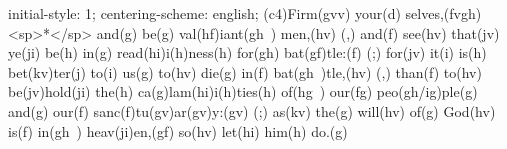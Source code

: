 initial-style: 1;
centering-scheme: english;
(c4)Firm(gvv) your(d) selves,(fvgh) <sp>*</sp> and(g) be(g) val(hf)iant(gh~) men,(hv) (,) and(f) see(hv) that(jv) ye(ji) be(h) in(g) read(hi)i(h)ness(h) for(gh) bat(gf)tle:(f) (;) for(jv) it(i) is(h) bet(kv)ter(j) to(i) us(g) to(hv) die(g) in(f) bat(gh~)tle,(hv) (,) than(f) to(hv) be(jv)hold(ji) the(h) ca(g)lam(hi)i(h)ties(h) of(hg~) our(fg) peo(gh/ig)ple(g) and(g) our(f) sanc(f)tu(gv)ar(gv)y:(gv) (;) as(kv) the(g) will(hv) of(g) God(hv) is(f) in(gh~) heav(ji)en,(gf) so(hv) let(hi) him(h) do.(g)
